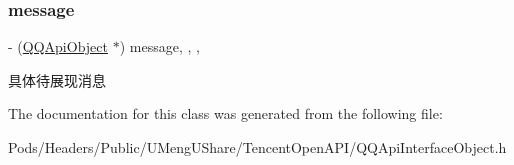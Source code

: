 \subsubsection{\texorpdfstring{message}{message}}
{\footnotesize\ttfamily -\/ (\mbox{\hyperlink{interface_q_q_api_object}{Q\+Q\+Api\+Object}} $\ast$) message\hspace{0.3cm}{\ttfamily [read]}, {\ttfamily [write]}, {\ttfamily [nonatomic]}, {\ttfamily [retain]}}

具体待展现消息 

The documentation for this class was generated from the following file\+:\begin{DoxyCompactItemize}
\item 
Pods/\+Headers/\+Public/\+U\+Meng\+U\+Share/\+Tencent\+Open\+A\+P\+I/Q\+Q\+Api\+Interface\+Object.\+h\end{DoxyCompactItemize}
